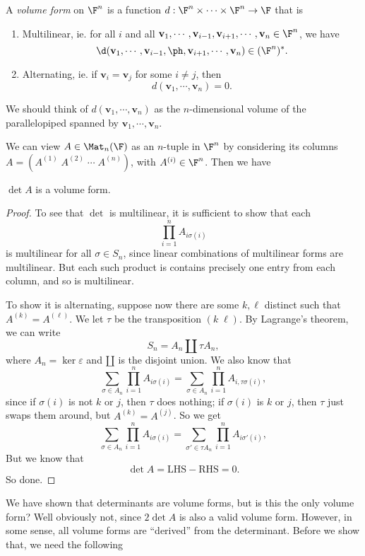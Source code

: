 \documentclass[a4paper]{article}
\begin{document}
\begin{defi}
  A \emph{volume form} on $\F^n$ is a function $d: \F^n \times \cdots \times \F^n \to \F$ that is
  \begin{enumerate}
    \item Multilinear, ie. for all $i$ and all $\mathbf{v}_1, \cdots, \mathbf{v}_{i - 1}, \mathbf{v}_{i + 1}, \cdots, \mathbf{v}_n \in \F^n$, we have
      \[
        \d (\mathbf{v}_1, \cdots, \mathbf{v}_{i - 1}, \ph, \mathbf{v}_{i + 1}, \cdots, \mathbf{v}_n) \in (\F^n)^*.
      \]
    \item Alternating, ie. if $\mathbf{v}_i = \mathbf{v}_j$ for some $i \not= j$, then
      \[
        d(\mathbf{v}_1, \cdots, \mathbf{v}_n) = 0.
      \]
  \end{enumerate}
\end{defi}
We should think of $d(\mathbf{v}_1, \cdots, \mathbf{v}_n)$ as the $n$-dimensional volume of the parallelopiped spanned by $\mathbf{v}_1, \cdots, \mathbf{v}_n$.

We can view $A \in \Mat_n(\F)$ as an $n$-tuple in $\F^n$ by considering its columns $A = (A^{(1)}\; A^{(2)}\; \cdots \; A^{(n)})$, with $A^{(i)} \in \F^n$. Then we have
\begin{lemma}
  $\det A$ is a volume form.
\end{lemma}

\begin{proof}
  To see that $\det$ is multilinear, it is sufficient to show that each
  \[
    \prod_{i = 1}^n A_{i \sigma(i)}
  \]
  is multilinear for all $\sigma \in S_n$, since linear combinations of multilinear forms are multilinear. But each such product is contains precisely one entry from each column, and so is multilinear.

  To show it is alternating, suppose now there are some $k, \ell$ distinct such that $A^{(k)} = A^{(\ell)}$. We let $\tau$ be the transposition $(k\; \ell)$. By Lagrange's theorem, we can write
  \[
    S_n = A_n \amalg \tau A_n,
  \]
  where $A_n = \ker \varepsilon$ and $\amalg$ is the disjoint union. We also know that
  \[
    \sum_{\sigma \in A_n} \prod_{i = 1}^n A_{i \sigma (i)} = \sum_{\sigma \in A_n} \prod_{i = 1}^n A_{i, \tau\sigma(i)},
  \]
  since if $\sigma(i)$ is not $k$ or $j$, then $\tau$ does nothing; if $\sigma(i)$ is $k$ or $j$, then $\tau$ just swaps them around, but $A^{(k)} = A^{(j)}$. So we get
  \[
    \sum_{\sigma \in A_n} \prod_{i = 1}^n A_{i \sigma (i)} = \sum_{\sigma' \in \tau A_n} \prod_{i = 1}^n A_{i\sigma'(i)},
  \]
  But we know that
  \[
    \det A = \text{LHS} - \text{RHS} = 0.
  \]
  So done.
\end{proof}
We have shown that determinants are volume forms, but is this the only volume form? Well obviously not, since $2 \det A$ is also a valid volume form. However, in some sense, all volume forms are ``derived'' from the determinant. Before we show that, we need the following
\end{document}
